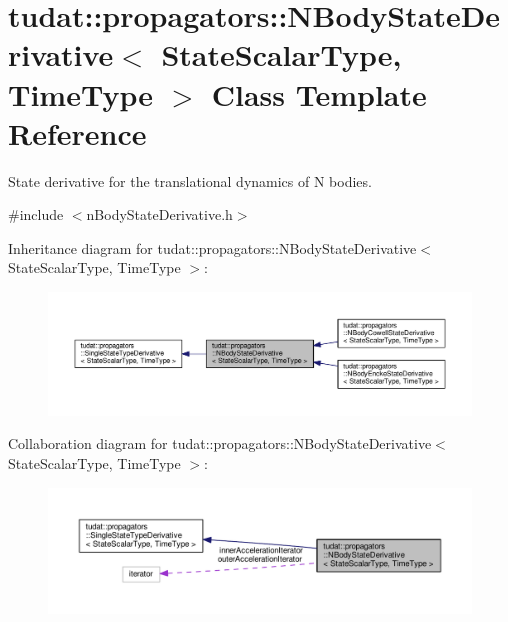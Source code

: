 \hypertarget{classtudat_1_1propagators_1_1NBodyStateDerivative}{}\section{tudat\+:\+:propagators\+:\+:N\+Body\+State\+Derivative$<$ State\+Scalar\+Type, Time\+Type $>$ Class Template Reference}
\label{classtudat_1_1propagators_1_1NBodyStateDerivative}


State derivative for the translational dynamics of N bodies.  




{\ttfamily \#include $<$n\+Body\+State\+Derivative.\+h$>$}



Inheritance diagram for tudat\+:\+:propagators\+:\+:N\+Body\+State\+Derivative$<$ State\+Scalar\+Type, Time\+Type $>$\+:
\nopagebreak
\begin{figure}[H]
\begin{center}
\leavevmode
\includegraphics[width=350pt]{classtudat_1_1propagators_1_1NBodyStateDerivative__inherit__graph}
\end{center}
\end{figure}


Collaboration diagram for tudat\+:\+:propagators\+:\+:N\+Body\+State\+Derivative$<$ State\+Scalar\+Type, Time\+Type $>$\+:
\nopagebreak
\begin{figure}[H]
\begin{center}
\leavevmode
\includegraphics[width=350pt]{classtudat_1_1propagators_1_1NBodyStateDerivative__coll__graph}
\end{center}
\end{figure}
